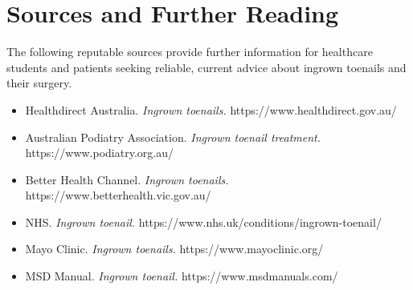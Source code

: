 \section*{Sources and Further Reading}
The following reputable sources provide further information for healthcare students and patients seeking reliable, current advice about ingrown toenails and their surgery.
\begin{itemize}
    \item Healthdirect Australia. \textit{Ingrown toenails.} https://www.healthdirect.gov.au/
    \item Australian Podiatry Association. \textit{Ingrown toenail treatment.} https://www.podiatry.org.au/
    \item Better Health Channel. \textit{Ingrown toenails.} https://www.betterhealth.vic.gov.au/
    \item NHS. \textit{Ingrown toenail.} https://www.nhs.uk/conditions/ingrown-toenail/
    \item Mayo Clinic. \textit{Ingrown toenails.} https://www.mayoclinic.org/
    \item MSD Manual. \textit{Ingrown toenail.} https://www.msdmanuals.com/
\end{itemize}
